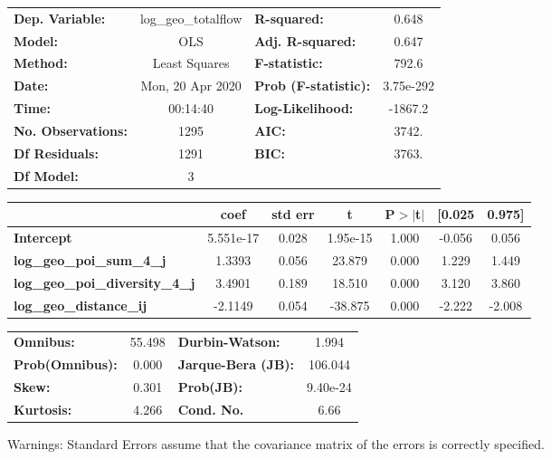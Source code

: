 \begin{center}
\begin{tabular}{lclc}
\toprule
\textbf{Dep. Variable:}                 & log\_geo\_totalflow & \textbf{  R-squared:         } &     0.648   \\
\textbf{Model:}                         &         OLS         & \textbf{  Adj. R-squared:    } &     0.647   \\
\textbf{Method:}                        &    Least Squares    & \textbf{  F-statistic:       } &     792.6   \\
\textbf{Date:}                          &   Mon, 20 Apr 2020  & \textbf{  Prob (F-statistic):} & 3.75e-292   \\
\textbf{Time:}                          &       00:14:40      & \textbf{  Log-Likelihood:    } &   -1867.2   \\
\textbf{No. Observations:}              &          1295       & \textbf{  AIC:               } &     3742.   \\
\textbf{Df Residuals:}                  &          1291       & \textbf{  BIC:               } &     3763.   \\
\textbf{Df Model:}                      &             3       & \textbf{                     } &             \\
\bottomrule
\end{tabular}
\begin{tabular}{lcccccc}
                                        & \textbf{coef} & \textbf{std err} & \textbf{t} & \textbf{P$> |$t$|$} & \textbf{[0.025} & \textbf{0.975]}  \\
\midrule
\textbf{Intercept}                      &    5.551e-17  &        0.028     &  1.95e-15  &         1.000        &       -0.056    &        0.056     \\
\textbf{log\_geo\_poi\_sum\_4\_j}       &       1.3393  &        0.056     &    23.879  &         0.000        &        1.229    &        1.449     \\
\textbf{log\_geo\_poi\_diversity\_4\_j} &       3.4901  &        0.189     &    18.510  &         0.000        &        3.120    &        3.860     \\
\textbf{log\_geo\_distance\_ij}         &      -2.1149  &        0.054     &   -38.875  &         0.000        &       -2.222    &       -2.008     \\
\bottomrule
\end{tabular}
\begin{tabular}{lclc}
\textbf{Omnibus:}       & 55.498 & \textbf{  Durbin-Watson:     } &    1.994  \\
\textbf{Prob(Omnibus):} &  0.000 & \textbf{  Jarque-Bera (JB):  } &  106.044  \\
\textbf{Skew:}          &  0.301 & \textbf{  Prob(JB):          } & 9.40e-24  \\
\textbf{Kurtosis:}      &  4.266 & \textbf{  Cond. No.          } &     6.66  \\
\bottomrule
\end{tabular}
\end{center}

Warnings: \newline
 [1] Standard Errors assume that the covariance matrix of the errors is correctly specified.